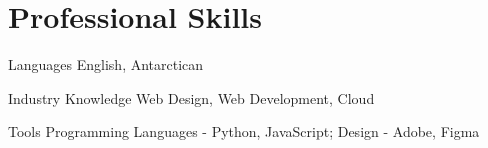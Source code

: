\section*{Professional Skills}

\componentsimplelist
    {Languages}
    {English, Antarctican}

\componentsimplelist
    {Industry Knowledge}
    {Web Design, Web Development, Cloud}

\componentsimplelist
    {Tools}
    {
        Programming Languages - Python, JavaScript;
        Design - Adobe, Figma
    }
